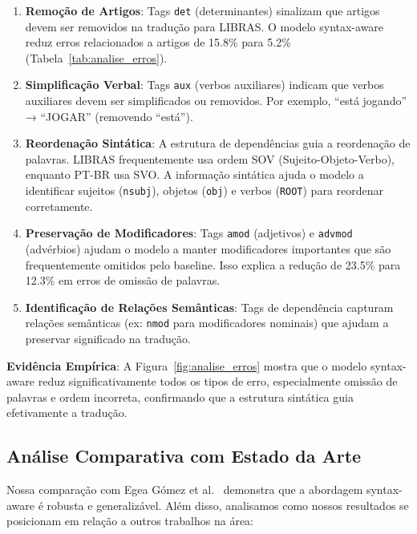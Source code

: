 \documentclass[12pt]{article}
\begin{document}
\begin{enumerate}
\item \textbf{Remoção de Artigos}: Tags \texttt{det} (determinantes) sinalizam que artigos devem ser removidos na tradução para LIBRAS. O modelo syntax-aware reduz erros relacionados a artigos de 15.8\% para 5.2\% (Tabela~\ref{tab:analise_erros}).

\item \textbf{Simplificação Verbal}: Tags \texttt{aux} (verbos auxiliares) indicam que verbos auxiliares devem ser simplificados ou removidos. Por exemplo, ``está jogando'' → ``JOGAR'' (removendo ``está'').

\item \textbf{Reordenação Sintática}: A estrutura de dependências guia a reordenação de palavras. LIBRAS frequentemente usa ordem SOV (Sujeito-Objeto-Verbo), enquanto PT-BR usa SVO. A informação sintática ajuda o modelo a identificar sujeitos (\texttt{nsubj}), objetos (\texttt{obj}) e verbos (\texttt{ROOT}) para reordenar corretamente.

\item \textbf{Preservação de Modificadores}: Tags \texttt{amod} (adjetivos) e \texttt{advmod} (advérbios) ajudam o modelo a manter modificadores importantes que são frequentemente omitidos pelo baseline. Isso explica a redução de 23.5\% para 12.3\% em erros de omissão de palavras.

\item \textbf{Identificação de Relações Semânticas}: Tags de dependência capturam relações semânticas (ex: \texttt{nmod} para modificadores nominais) que ajudam a preservar significado na tradução.
\end{enumerate}

\textbf{Evidência Empírica}: A Figura~\ref{fig:analise_erros} mostra que o modelo syntax-aware reduz significativamente todos os tipos de erro, especialmente omissão de palavras e ordem incorreta, confirmando que a estrutura sintática guia efetivamente a tradução.

\subsection{Análise Comparativa com Estado da Arte}

Nossa comparação com Egea Gómez et al.~\cite{egea2021} demonstra que a abordagem syntax-aware é robusta e generalizável. Além disso, analisamos como nossos resultados se posicionam em relação a outros trabalhos na área:
\end{document}
